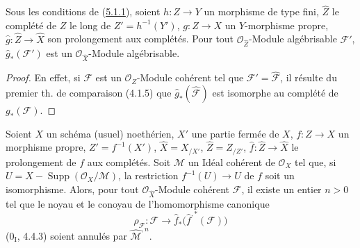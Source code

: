 \begin{lemma}[5.3.3]
\label{III.5.3.3-fr}
Sous les conditions de (\hyperref[III.5.1.1-fr]{5.1.1}), soient $h:Z\to Y$ un
morphisme de type fini, $\widehat Z$ le complété de $Z$ le long de
$Z'=h^{-1}(Y')$, $g:Z\to X$ un $Y$-morphisme propre,
$\widehat g:\widehat Z\to\widehat X$ son prolongement aux complétés. Pour tout
$\mathcal O_{\widehat Z}$-Module algébrisable $\mathcal F'$,
$\widehat g_*(\mathcal F')$ est un $\mathcal O_{\widehat X}$-Module algébrisable.
\end{lemma}

\begin{proof}
En effet, si $\mathcal F$ est un $\mathcal O_Z$-Module cohérent tel que
$\mathcal F'=\widehat{\mathcal F}$, il résulte du premier th. de comparaison
(4.1.5) que $\widehat g_*(\widehat{\mathcal F})$ est isomorphe au complété de
$g_*(\mathcal F)$.
\end{proof}

\begin{lemma}[5.3.4]
\label{III.5.3.4-fr}
Soient $X$ un schéma (usuel) noethérien, $X'$ une partie fermée de $X$,
$f:Z\to X$ un morphisme propre, $Z'=f^{-1}(X')$,
$\widehat X=X_{/X'}$, $\widehat Z=Z_{/Z'}$,
$\widehat f:\widehat Z\to\widehat X$ le prolongement de $f$ aux complétés. Soit
$\mathcal M$ un Idéal cohérent de $\mathcal O_X$ tel que, si
$U=X-\operatorname{Supp}(\mathcal O_X/\mathcal M)$, la restriction
$f^{-1}(U)\to U$ de $f$ soit un isomorphisme. Alors, pour tout
$\mathcal O_{\widehat X}$-Module cohérent $\mathcal F$, il existe un entier $n>0$
tel que le noyau et le conoyau de l'homomorphisme canonique
\[
\rho_{\mathcal F}:\mathcal F\longrightarrow
\widehat f_*\bigl(\widehat f^{,*}(\mathcal F)\bigr)
\]
($0_{\mathrm I}$, 4.4.3) soient annulés par $\widehat{\mathcal M}^{,n}$.
\end{lemma}

